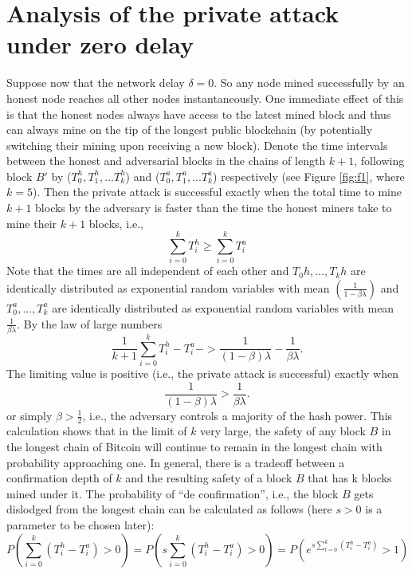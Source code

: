 \section{Analysis of the private attack under zero delay}
Suppose now that the network delay $\delta = 0$. So any node mined successfully by an honest node reaches all other nodes instantaneously. One immediate eﬀect of this is that the honest nodes always have access to the latest mined block and thus can always mine on the tip of the longest public blockchain (by potentially switching their mining upon receiving a new block). Denote the time intervals between the honest and adversarial blocks in the chains of length $k + 1$, following block $B′$ by ($T_{0}^{h}, T_{1}^{h}, . . . T_{k}^{h}$) and ($T_{0}^{a}, T_{1}^{a}, . . . T_{k}^{a}$) respectively (see Figure \ref{fig:f1}, where $k = 5$). Then the private attack is successful exactly when the total time to mine $k + 1$ blocks by the adversary is faster than the time the honest miners take to mine their $k + 1$ blocks, i.e.,
\begin{equation*}
    \sum_{i=0}^{k} T_{i}^{h} \geq \sum_{i=0}^{k} T_{i}^{a}
\end{equation*}
Note that the times are all independent of each other and $T_{0}{h}, . . . , T_{k}{h}$ are identically distributed as exponential random variables with mean $(\frac{1}{1 - \beta\lambda})$ and $T_{0}^{a}, . . . , T_{k}^{a}$ are identically distributed as exponential random variables with mean $\frac{1}{\beta\lambda}$. By the law of large 
numbers
\begin{equation*}
    \frac{1}{k + 1}\sum_{i=0}^{k} T_{i}^{h} - T_{i}^{a}   -> \frac{1}{(1 - \beta) \lambda} - \frac{1}{\beta\lambda}.
\end{equation*}
The limiting value is positive (i.e., the private attack is successful) exactly when
\begin{equation*}
    \frac{1}{(1 - \beta) \lambda} > \frac{1}{\beta\lambda}.
\end{equation*}
or simply $\beta > \frac{1}{2}$, i.e., the adversary controls a majority of the hash power. This calculation shows that in the limit of $k$ very large, the safety of any block $B$ in the longest chain of Bitcoin will continue to remain in the longest chain with probability approaching one. In general, there is a tradeoﬀ between a confirmation depth of $k$ and the resulting safety of a block $B$ that has k blocks mined under it. The probability of “de confirmation”, i.e., the block $B$ gets dislodged from the longest chain can be calculated as follows (here $s > 0$ is a parameter to be chosen later):
\begin{equation}
    P(\sum_{i=0}^{k}(T_{i}^{h} - T_{i}^{a}) > 0) = P(s\sum_{i=0}^{k}(T_{i}^{h} - T_{i}^{a}) > 0) = P(e^{s\sum_{t=0}^{k}(T_{i}^{h} - T_{i}^{a})} > 1)    
\end{equation}

